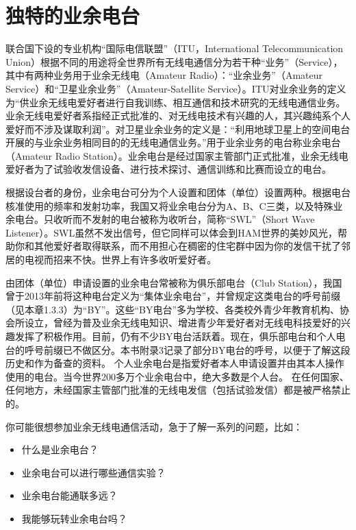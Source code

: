 \documentclass[12pt,UTF8]{ctexbook}
\begin{document}
\section{独特的业余电台}

联合国下设的专业机构“国际电信联盟”（ITU，International Telecommunication Union）根据不同的用途将全世界所有无线电通信分为若干种“业务”（Service），其中有两种业务用于业余无线电（Amateur Radio）：“业余业务”（Amateur Service）和“卫星业余业务”（Amateur-Satellite Service）。ITU对业余业务的定义为“供业余无线电爱好者进行自我训练、相互通信和技术研究的无线电通信业务。业余无线电爱好者系指经正式批准的、对无线电技术有兴趣的人，其兴趣纯系个人爱好而不涉及谋取利润”。对卫星业余业务的定义是：“利用地球卫星上的空间电台开展的与业余业务相同目的的无线电通信业务。”用于业余业务的电台称业余电台（Amateur Radio Station）。业余电台是经过国家主管部门正式批准，业余无线电爱好者为了试验收发信设备、进行技术探讨、通信训练和比赛而设立的电台。

根据设台者的身份，业余电台可分为个人设置和团体（单位）设置两种。根据电台核准使用的频率和发射功率，我国又将业余电台分为A、B、C三类，以及特殊业余电台。只收听而不发射的电台被称为收听台，简称“SWL”（Short Wave Listener）。SWL虽然不发出信号，但它同样可以体会到HAM世界的美妙风光，帮助你和其他爱好者取得联系，而不用担心在稠密的住宅群中因为你的发信干扰了邻居的电视而招来不快。世界上有许多收听爱好者。

由团体（单位）申请设置的业余电台常被称为俱乐部电台（Club Station），我国曾于2013年前将这种电台定义为“集体业余电台”，并曾规定这类电台的呼号前缀（见本章1.3.3）为“BY”。这些“BY电台”多为学校、各类校外青少年教育机构、协会所设立，曾经为普及业余无线电知识、增进青少年爱好者对无线电科技爱好的兴趣发挥了积极作用。目前，仍有不少BY电台活跃着。现在，俱乐部电台和个人电台的呼号前缀已不做区分。本书附录3记录了部分BY电台的呼号，以便于了解这段历史和作为备查的资料。
个人业余电台是指爱好者本人申请设置并由其本人操作使用的电台。当今世界200多万个业余电台中，绝大多数是个人台。
在任何国家、任何地方，未经国家主管部门批准的无线电发信（包括试验发信）都是被严格禁止的。

你可能很想参加业余无线电通信活动，急于了解一系列的问题，比如：

\begin{itemize}
	\item 什么是业余电台？
	\item 业余电台可以进行哪些通信实验？
	\item 业余电台能通联多远？
	\item 我能够玩转业余电台吗？
\end{itemize}  
\end{document}
